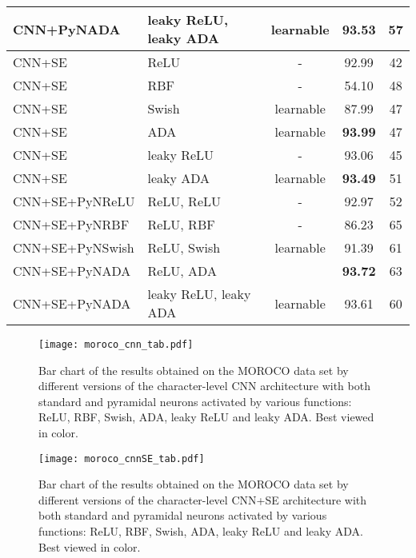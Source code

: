 \documentclass[pdflatex,sn-mathphys]{sn-jnl}
\theoremstyle{thmstyleone}
\theoremstyle{thmstyletwo}\newtheorem{example}{Example}\newtheorem{remark}{Remark}
\theoremstyle{thmstylethree}\newtheorem{definition}{Definition}\DeclareMathOperator{\sinc}{sinc}
\begin{document}
\begin{table}[t]
{\begin{center}
\begin{tabular}{llccc}
CNN+PyNADA                      & leaky ReLU, leaky ADA & learnable    & 93.53       & 57\\
\toprule
CNN+SE~\cite{Butnaru-ACL-2019}  & ReLU		            & -	            	    & 92.99                 & 42\\
CNN+SE                          & RBF	                & -                     & 54.10                 & 48\\
CNN+SE                          & Swish	                & learnable     & 87.99                 & 47\\
CNN+SE                          & ADA 		            & learnable    & {\bf 93.99}      & 47\\
\midrule
CNN+SE                          & leaky ReLU	        & -             	    & 93.06                 & 45\\
CNN+SE                          & leaky ADA 	        & learnable	& {\bf 93.49}       & 51\\
\midrule
CNN+SE+PyNReLU                  & ReLU, ReLU 	        & -	                    & 92.97                 & 52\\
CNN+SE+PyNRBF                   & ReLU, RBF 	        & -	                    & 86.23                 & 65\\
CNN+SE+PyNSwish                 & ReLU, Swish 	        & learnable	    & 91.39                 & 61\\
CNN+SE+PyNADA                   & ReLU, ADA 	        & 	        & {\bf 93.72}       & 63\\
CNN+SE+PyNADA                   & leaky ReLU, leaky ADA & learnable    & 93.61       & 60\\
\bottomrule
\end{tabular}
\end{center}
}
\end{table}


\begin{figure}[!t]
\begin{center}
\centerline{\texttt{[image: moroco\_cnn\_tab.pdf]}}
\caption{Bar chart of the results obtained on the MOROCO data set by different versions of the character-level CNN \cite{Butnaru-ACL-2019} architecture with both standard and pyramidal neurons activated by various functions: ReLU, RBF, Swish, ADA, leaky ReLU and leaky ADA. Best viewed in color.}
\label{fig_tab_moroco_cnn}
\end{center}
\end{figure}

\begin{figure}[!t]
\begin{center}
\centerline{\texttt{[image: moroco\_cnnSE\_tab.pdf]}}
\caption{Bar chart of the results obtained on the MOROCO data set by different versions of the character-level CNN+SE \cite{Butnaru-ACL-2019} architecture with both standard and pyramidal neurons activated by various functions: ReLU, RBF, Swish, ADA, leaky ReLU and leaky ADA. Best viewed in color.}
\label{fig_tab_moroco_cnnSE}
\end{center}
\end{figure}
\end{document}
